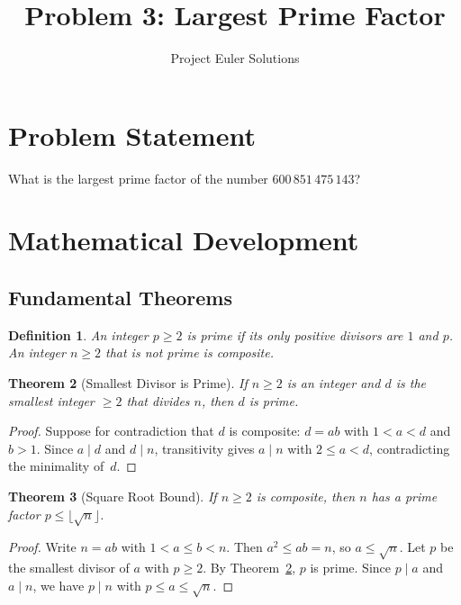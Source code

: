 \documentclass[11pt]{article}
\title{Problem 3: Largest Prime Factor}
\author{Project Euler Solutions}
\date{}
\newtheorem{theorem}{Theorem}
\newtheorem{definition}[theorem]{Definition}
\begin{document}
\maketitle

\section{Problem Statement}

What is the largest prime factor of the number $600\,851\,475\,143$?

\section{Mathematical Development}

\subsection{Fundamental Theorems}

\begin{definition}
An integer $p \ge 2$ is \emph{prime} if its only positive divisors are $1$ and $p$. An integer $n \ge 2$ that is not prime is \emph{composite}.
\end{definition}

\begin{theorem}[Smallest Divisor is Prime]
\label{thm:smallest}
If $n \ge 2$ is an integer and $d$ is the smallest integer $\ge 2$ that divides $n$, then $d$ is prime.
\end{theorem}

\begin{proof}
Suppose for contradiction that $d$ is composite: $d = ab$ with $1 < a < d$ and $b > 1$. Since $a \mid d$ and $d \mid n$, transitivity gives $a \mid n$ with $2 \le a < d$, contradicting the minimality of~$d$.
\end{proof}

\begin{theorem}[Square Root Bound]
\label{thm:sqrt}
If $n \ge 2$ is composite, then $n$ has a prime factor $p \le \lfloor\sqrt{n}\rfloor$.
\end{theorem}

\begin{proof}
Write $n = ab$ with $1 < a \le b < n$. Then $a^2 \le ab = n$, so $a \le \sqrt{n}$. Let $p$ be the smallest divisor of $a$ with $p \ge 2$. By Theorem~\ref{thm:smallest}, $p$ is prime. Since $p \mid a$ and $a \mid n$, we have $p \mid n$ with $p \le a \le \sqrt{n}$.
\end{proof}
\end{document}
